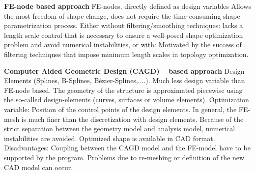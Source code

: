 \textbf{FE-node based approach}
FE-nodes, directly defined as design variables
Allows the most freedom of shape change, does not require the time-consuming shape parametrization process.
Either without filtering/smoothing techniques:  lacks a length scale control that is necessary to ensure a well-posed shape optimization problem and avoid numerical instabilities, or with: Motivated by the success of filtering techniques that impose minimum length scales in topology optimization.

\textbf{Computer Aided Geometric Design (CAGD) – based approach}
Design Elements (Splines, B-Splines, Bézier-Splines,....). Much less design variable than FE-node based.
The geometry of the structure is approximated piecewise using the so-called design-elements (curves, surfaces or volume elements).
Optimization variable: Position of the control points of the design elements. 
In general, the FE-mesh is much finer than the discretization with design elements. 
Because of the strict separation between the geometry model and analysis model, numerical instabilities are avoided.
Optimized shape is available in CAD format. Disadvantages:
Coupling between the CAGD model and the FE-model have to be supported by the program.
Problems due to re-meshing or definition of the new CAD model can occur.

